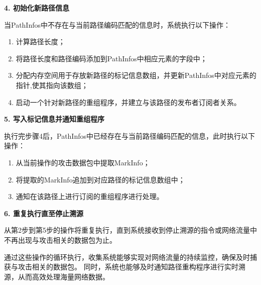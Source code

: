 \textbf{4. 初始化新路径信息}\par
当PathInfos中不存在与当前路径编码匹配的信息时，系统执行以下操作：
\begin{enumerate}[label=\roman*.]
  \item 计算路径长度；
  \item 将路径长度和路径编码添加到PathInfos中相应元素的字段中；
  \item 分配内存空间用于存放新路径的标记信息数组，并更新PathInfos中对应元素的指针,使其指向该数组；
  \item 启动一个针对新路径的重组程序，并建立与该路径的发布者订阅者关系。
\end{enumerate}
\par

\textbf{5. 写入标记信息并通知重组程序}\par
执行完步骤4后，PathInfos中已经存在与当前路径编码匹配的信息，此时执行以下操作：
\begin{enumerate}[label=\roman*.]
  \item 从当前操作的攻击数据包中提取MarkInfo；
  \item 将提取的MarkInfo追加到对应路径的标记信息数组中；
  \item 通知在该路径上进行订阅的重组程序进行处理。
\end{enumerate}
\par
\textbf{6. 重复执行直至停止溯源}\par
从第2步到第5步的操作将重复执行，直到系统接收到停止溯源的指令或网络流量中不再出现与攻击相关的数据包为止。\par

通过这些操作的循环执行，收集系统能够实现对网络流量的持续监控，确保及时捕获与攻击相关的数据包。
同时，系统也能够及时通知路径重构程序进行实时溯源，从而高效处理海量网络数据。


